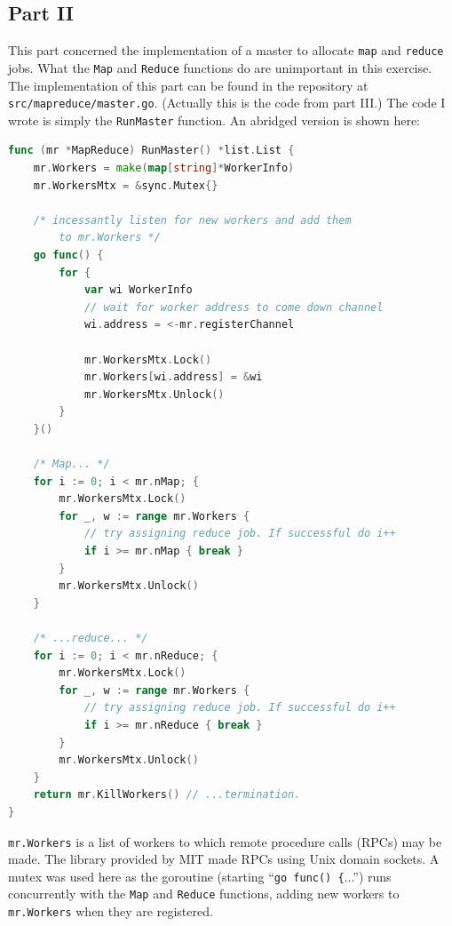 \documentclass[11pt,a4paper]{report}
\begin{document}
	\subsection{Part II}
	This part concerned the implementation of a master to allocate \verb=map= and \verb=reduce= jobs. What the \verb=Map= and \verb=Reduce= functions do are unimportant in this exercise. The implementation of this part can be found in the repository at \verb=src/mapreduce/master.go=. (Actually this is the code from part III.) The code I wrote is simply the \verb=RunMaster= function. An abridged version is shown here:
	\begin{lstlisting}[language=go]
func (mr *MapReduce) RunMaster() *list.List {
    mr.Workers = make(map[string]*WorkerInfo)
    mr.WorkersMtx = &sync.Mutex{}

    /* incessantly listen for new workers and add them
        to mr.Workers */
    go func() {
        for {
            var wi WorkerInfo
            // wait for worker address to come down channel
            wi.address = <-mr.registerChannel

            mr.WorkersMtx.Lock()
            mr.Workers[wi.address] = &wi
            mr.WorkersMtx.Unlock()
        }
    }()

    /* Map... */
    for i := 0; i < mr.nMap; {
        mr.WorkersMtx.Lock()
        for _, w := range mr.Workers {
            // try assigning reduce job. If successful do i++
            if i >= mr.nMap { break }
        }
        mr.WorkersMtx.Unlock()
    }

    /* ...reduce... */
    for i := 0; i < mr.nReduce; {
        mr.WorkersMtx.Lock()
        for _, w := range mr.Workers {
            // try assigning reduce job. If successful do i++
            if i >= mr.nReduce { break }
        }
        mr.WorkersMtx.Unlock()
    }
    return mr.KillWorkers() // ...termination.
}
	\end{lstlisting}
	
	\verb=mr.Workers= is a list of workers to which remote procedure calls (RPCs) may be made. The library provided by MIT made RPCs using Unix domain sockets. A mutex was used here as the goroutine (starting ``\verb=go func() {=...'') runs concurrently with the \verb=Map= and \verb=Reduce= functions, adding new workers to \verb=mr.Workers= when they are registered.
	
\end{document}
